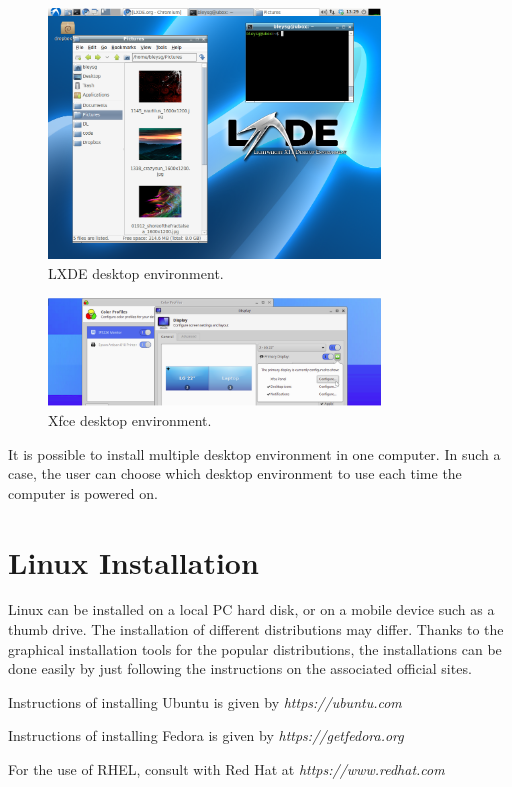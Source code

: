 \begin{figure}
	\centering
	\includegraphics[width=250pt]{chapters/ch-brief-introduction-to-linux/figures/lxde_demo.png}
	\caption{LXDE desktop environment.} \label{ch:bitl:fig:lxdedemo}
\end{figure}

\begin{figure}
	\centering
	\includegraphics[width=250pt]{chapters/ch-brief-introduction-to-linux/figures/xfce_demo.png}
	\caption{Xfce desktop environment.} \label{ch:bitl:fig:xfcedemo}
\end{figure}

It is possible to install multiple desktop environment in one computer. In such a case, the user can choose which desktop environment to use each time the computer is powered on.

\section{Linux Installation}

Linux can be installed on a local PC hard disk, or on a mobile device such as a thumb drive. The installation of different distributions may differ. Thanks to the graphical installation tools for the popular distributions, the installations can be done easily by just following the instructions on the associated official sites.

Instructions of installing Ubuntu is given by \textit{https://ubuntu.com}

Instructions of installing Fedora is given by \textit{https://getfedora.org}

For the use of RHEL, consult with Red Hat at \textit{https://www.redhat.com}
